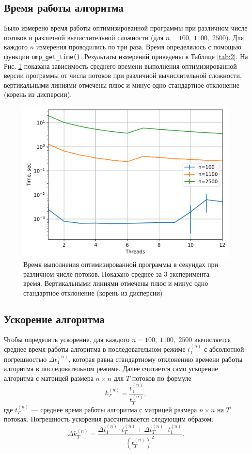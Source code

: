 \documentclass[12pt]{article}
\begin{document}
\subsection{Время работы алгоритма}
Было измерено время работы оптимизированной программы при различном числе потоков и различной вычислительной сложности (для $n=100,\; 1100,\; 2500$). Для каждого $n$ измерения проводились по три раза. Время определялось с помощью функции \texttt{omp\_get\_time()}. Результаты измерений приведены в Таблице \ref{tab:2}. На Рис. \ref{fig:t_vs_threads} показана зависимость среднего времени выполнения оптимизированной версии программы от числа потоков при различной вычислительной сложности, вертикальными линиями отмечены плюс и минус одно стандартное отклонение (корень из дисперсии). 
\begin{figure}[htbp]
    \centering
    \includegraphics[scale=0.75]{t_vs_threads.png}
    \caption{Время выполнения оптимизированной программы в секундах при различном числе потоков. Показано среднее за 3 эксперимента время. Вертикальными линиями отмечены плюс и минус одно стандартное отклонение (корень из дисперсии)}
    \label{fig:t_vs_threads}
\end{figure}

\subsection{Ускорение алгоритма}

Чтобы определить ускорение, для каждого $n = 100,\; 1100,\; 2500$ вычисляется среднее время работы алгоритма в последовательном режиме $t^{(n)}_1$ с абсолютной погрешностью $\Delta t^(n)_1$, которая равна стандартному отклонению времени работы алгоритма в последовательном режиме. Далее считается само ускорение алгоритма с матрицей размера $n\times n$ для $T$ потоков по формуле
\begin{equation}
    k^{(n)}_T = \dfrac{t^{(n)}_1}{t^{(n)}_T},
\end{equation}
где $t^{(n)}_T$ --- среднее время работы алгоритма с матрицей размера $n\times n$ на $T$ потоках. Погрешность ускорения рассчитывается следующим образом:
\begin{equation}
   \Delta k^{(n)}_T = \dfrac{\Delta t^{(n)}_1 \cdot t^{(n)}_T + \Delta t^{(n)}_T \cdot t^{(n)}_1}{(t^{(n)}_T)^2}.
\end{equation}
\end{document}
